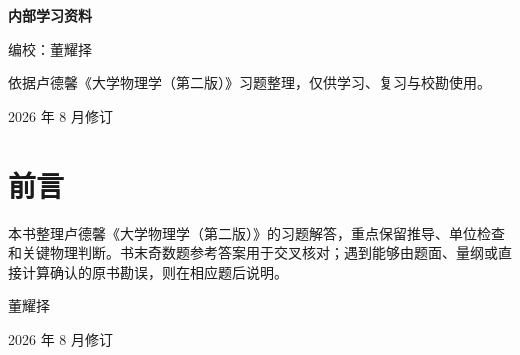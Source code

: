 \documentclass[lang=cn,zihao=-4,a4paper,openany,fontset=fandol]{beautybook}
\begin{document}
\clearpage
\copyrights
\makeatletter
\thispagestyle{empty} %
\vspace*{5em}         %
\begingroup\raggedright

\ifdefempty{\@faculty}{}{\noindent{\large\sffamily\bfseries\@faculty} \\}
\ifdefempty{\@university}{}{{\large\sffamily\bfseries\@university} \\[1.5em]}
{\large\bfseries 内部学习资料}\par
\vspace{0.8em}
编校：董耀择\par
依据卢德馨《大学物理学（第二版）》习题整理，仅供学习、复习与校勘使用。\par
\vfill
2026 年 8 月修订\par
\endgroup

\clearpage
\makeatother






\frontmatter
{}

{%
\thispagestyle{empty}
\chapter*{前言}

本书整理卢德馨《大学物理学（第二版）》的习题解答，重点保留推导、单位检查和关键物理判断。书末奇数题参考答案用于交叉核对；遇到能够由题面、量纲或直接计算确认的原书勘误，则在相应题后说明。

\vspace{1em}
\begin{flushright}
董耀择\par
2026 年 8 月修订
\end{flushright}

\clearpage}

\thispagestyle{empty}
\tableofcontents
\clearpage

\mainmatter
{}





\makebottomcover
\end{document}
